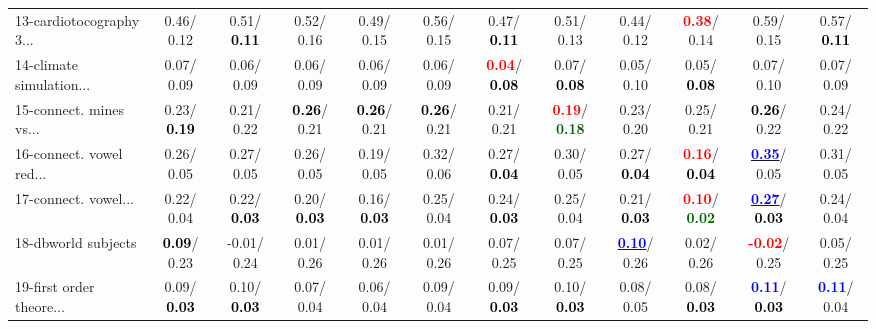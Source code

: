\begin{table}[h]
\begin{center}
{\begin{tabular}{lc|c|c|c|c|c|c|c|c|c|c}
13-cardiotocography 3... &   0.46/  0.12 &   0.51/\textcolor{black}{\textbf{  0.11}} &   0.52/  0.16 &   0.49/  0.15 &   0.56/  0.15 &   0.47/\textcolor{black}{\textbf{  0.11}} &   0.51/  0.13 &   0.44/  0.12 & \textcolor{red}{\textbf{  0.38}}/  0.14 &   0.59/  0.15 &   0.57/\textcolor{black}{\textbf{  0.11}} \\
14-climate simulation... &   0.07/  0.09 &   0.06/  0.09 &   0.06/  0.09 &   0.06/  0.09 &   0.06/  0.09 & \textcolor{red}{\textbf{  0.04}}/\textcolor{black}{\textbf{  0.08}} &   0.07/\textcolor{black}{\textbf{  0.08}} &   0.05/  0.10 &   0.05/\textcolor{black}{\textbf{  0.08}} &   0.07/  0.10 &   0.07/  0.09 \\ \hline
15-connect. mines vs... &   0.23/\textcolor{black}{\textbf{  0.19}} &   0.21/  0.22 & \textcolor{black}{\textbf{  0.26}}/  0.21 & \textcolor{black}{\textbf{  0.26}}/  0.21 & \textcolor{black}{\textbf{  0.26}}/  0.21 &   0.21/  0.21 & \textcolor{red}{\textbf{  0.19}}/\textcolor{darkgreen}{\textbf{  0.18}} &   0.23/  0.20 &   0.25/  0.21 & \textcolor{black}{\textbf{  0.26}}/  0.22 &   0.24/  0.22 \\
16-connect. vowel red... &   0.26/  0.05 &   0.27/  0.05 &   0.26/  0.05 &   0.19/  0.05 &   0.32/  0.06 &   0.27/\textcolor{black}{\textbf{  0.04}} &   0.30/  0.05 &   0.27/\textcolor{black}{\textbf{  0.04}} & \textcolor{red}{\textbf{  0.16}}/\textcolor{black}{\textbf{  0.04}} & \underline{\textcolor{blue}{\textbf{  0.35}}}/  0.05 &   0.31/  0.05 \\
17-connect. vowel... &   0.22/  0.04 &   0.22/\textcolor{black}{\textbf{  0.03}} &   0.20/\textcolor{black}{\textbf{  0.03}} &   0.16/\textcolor{black}{\textbf{  0.03}} &   0.25/  0.04 &   0.24/\textcolor{black}{\textbf{  0.03}} &   0.25/  0.04 &   0.21/\textcolor{black}{\textbf{  0.03}} & \textcolor{red}{\textbf{  0.10}}/\textcolor{darkgreen}{\textbf{  0.02}} & \underline{\textcolor{blue}{\textbf{  0.27}}}/\textcolor{black}{\textbf{  0.03}} &   0.24/  0.04 \\
18-dbworld subjects & \textcolor{black}{\textbf{  0.09}}/  0.23 &  -0.01/  0.24 &   0.01/  0.26 &   0.01/  0.26 &   0.01/  0.26 &   0.07/  0.25 &   0.07/  0.25 & \underline{\textcolor{blue}{\textbf{  0.10}}}/  0.26 &   0.02/  0.26 & \textcolor{red}{\textbf{ -0.02}}/  0.25 &   0.05/  0.25 \\
19-first order theore... &   0.09/\textcolor{black}{\textbf{  0.03}} &   0.10/\textcolor{black}{\textbf{  0.03}} &   0.07/  0.04 &   0.06/  0.04 &   0.09/  0.04 &   0.09/\textcolor{black}{\textbf{  0.03}} &   0.10/\textcolor{black}{\textbf{  0.03}} &   0.08/  0.05 &   0.08/\textcolor{black}{\textbf{  0.03}} & \textcolor{blue}{\textbf{  0.11}}/\textcolor{black}{\textbf{  0.03}} & \textcolor{blue}{\textbf{  0.11}}/  0.04 \\

\end{tabular}}
\end{center}
\end{table}
